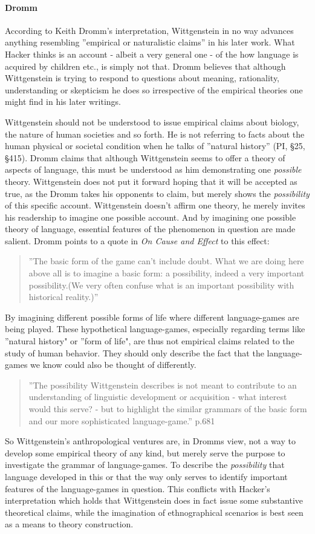 \documentclass{article}
\begin{document}
\paragraph{Dromm}
According to Keith Dromm's interpretation, Wittgenstein in no way advances anything resembling ''empirical or naturalistic claims'' in his later work. What Hacker thinks is an account - albeit a very general one - of the how language is acquired by children etc., is simply not that. Dromm believes that although Wittgenstein is trying to respond to questions about meaning, rationality, understanding or skepticism he does so irrespective of the empirical theories one might find in his later writings.

Wittgenstein should not be understood to issue empirical claims about biology, the nature of human societies and so forth. He is not referring to facts about the human physical or societal condition when he talks of ''natural history'' (PI, §25, §415). Dromm claims that although Wittgenstein seems to offer a theory of aspects of language, this must be understood as him demonstrating one \textit{possible} theory. Wittgenstein does not put it forward hoping that it will be accepted as true, as the Dromm takes his opponents to claim, but merely shows the \textit{possibility} of this specific account. Wittgenstein doesn't affirm one theory, he merely invites his readership to imagine one possible account. And by imagining one possible theory of language, essential features of the phenomenon in question are made salient. Dromm points to a quote in \textit{On Cause and Effect} to this effect:
\begin{quote}
''The basic form of the game can't include doubt. What we are doing here above all is to imagine a basic form: a possibility, indeed a very important possibility.(We very often confuse what is an important possibility with historical reality.)''
\end{quote}
By imagining different possible forms of life where different language-games are being played. These hypothetical language-games, especially regarding terms like ''natural history" or ''form of life", are thus not empirical claims related to the study of human behavior. They should only describe the fact that the language-games we know could also be thought of differently.
\begin{quote}
''The possibility Wittgenstein describes is not meant to contribute to an understanding of linguistic development or acquisition - what interest would this serve? - but to highlight the similar grammars of the basic form and our more sophisticated language-game.'' p.681
\end{quote}
So Wittgenstein's anthropological ventures are, in Dromms view, not a way to develop some empirical theory of any kind, but merely serve the purpose to investigate the grammar of language-games. To describe the \textit{possibility} that language developed in this or that the way only serves to identify important features of the language-games in question. This conflicts with Hacker's interpretation which holds that Wittgenstein does in fact issue some substantive theoretical claims, while the imagination of ethnographical scenarios is best seen as a means to theory construction.
\end{document}
